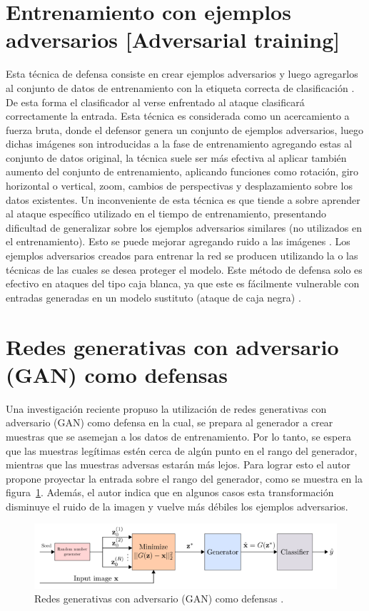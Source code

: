 \section{Entrenamiento con ejemplos adversarios [Adversarial training]}
Esta técnica de defensa consiste en crear ejemplos adversarios y luego agregarlos al conjunto de datos de entrenamiento con la etiqueta correcta de clasificación \parencite{r19}. De esta forma el clasificador al verse enfrentado al ataque clasificará correctamente la entrada. Esta técnica es considerada como un acercamiento a fuerza bruta, donde el defensor genera un conjunto de ejemplos adversarios, luego dichas imágenes son introducidas a la fase de entrenamiento agregando estas al conjunto de datos original, la técnica suele ser más efectiva al aplicar también aumento del conjunto de entrenamiento, aplicando funciones como rotación, giro horizontal o vertical, zoom, cambios de perspectivas y desplazamiento sobre los datos existentes. Un inconveniente de esta técnica es que tiende a sobre aprender al ataque específico utilizado en el tiempo de entrenamiento, presentando dificultad de generalizar sobre los ejemplos adversarios similares (no utilizados en el entrenamiento). Esto se puede mejorar agregando ruido a las imágenes \parencite{r6}. Los ejemplos adversarios creados para entrenar la red se producen utilizando la o las técnicas de las cuales se desea proteger el modelo. Este método de defensa solo es efectivo en ataques del tipo caja blanca, ya que este es fácilmente vulnerable con entradas generadas en un modelo sustituto (ataque de caja negra) \parencite{r7}. 

\section{Redes generativas con adversario (GAN) como defensas}
Una investigación reciente \parencite{r39} propuso la utilización de redes generativas con adversario (GAN) como defensa en la cual, se prepara al generador a crear muestras que se asemejan a los datos de entrenamiento. Por lo tanto, se espera que las muestras legítimas estén cerca de algún punto en el rango del generador, mientras que las muestras adversas estarán más lejos. Para lograr esto el autor propone proyectar la entrada sobre el rango del generador, como se muestra en la figura~\ref{fig:32}. Además, el autor indica que en algunos casos esta transformación disminuye el ruido de la imagen y vuelve más débiles los ejemplos adversarios.

\begin{figure}[th]
\centering
\includegraphics[scale = 0.9]{Figures/figura_32.PNG}
\decoRule
\caption[Redes generativas con adversario (GAN) como defensas]{Redes generativas con adversario (GAN) como defensas \parencite{r39}.}
\label{fig:32}
\end{figure}

